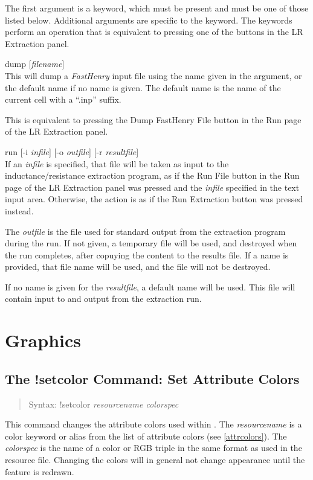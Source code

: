 The first argument is a keyword, which must be present and must be one
of those listed below.  Additional arguments are specific to the
keyword.  The keywords perform an operation that is equivalent to
pressing one of the buttons in the {\cb LR Extraction} panel.

\begin{description}
\item{\vt dump} [{\it filename\/}]\\
This will dump a {\it FastHenry} input file using the name given in the
argument, or the default name if no name is given.  The default name
is the name of the current cell with a ``{\vt .inp}'' suffix.

This is equivalent to pressing the {\cb Dump FastHenry File} button
in the {\cb Run} page of the {\cb LR Extraction} panel.

\item{\vt run} [{\vt -i} {\it infile\/}] [{\vt -o} {\it outfile\/}]
 [{\vt -r} {\it resultfile}]\\
If an {\it infile} is specified, that file will be taken as input to
the inductance/resistance extraction program, as if the {\cb Run File}
button in the {\cb Run} page of the {\cb LR Extraction} panel was
pressed and the {\it infile} specified in the text input area. 
Otherwise, the action is as if the {\cb Run Extraction} button was
pressed instead.

The {\it outfile} is the file used for standard output from the
extraction program during the run.  If not given, a temporary file
will be used, and destroyed when the run completes, after copuying the
content to the results file.  If a name is provided, that file name
will be used, and the file will not be destroyed.

If no name is given for the {\it resultfile}, a default name will be
used.  This file will contain input to and output from the extraction
run.
\end{description}

\section{Graphics}

\subsection{The {\cb !setcolor} Command: Set Attribute Colors}
\begin{quote}
Syntax: {\vt !setcolor {\it resourcename colorspec}} \\
\end{quote}
This command changes the attribute colors used within {\Xic}.  The
{\it resourcename} is a color keyword or alias from the list of
attribute colors (see \ref{attrcolors}).  The {\it colorspec} is the
name of a color or RGB triple in the same format as used in the
resource file.  Changing the colors will in general not change
appearance until the feature is redrawn.

